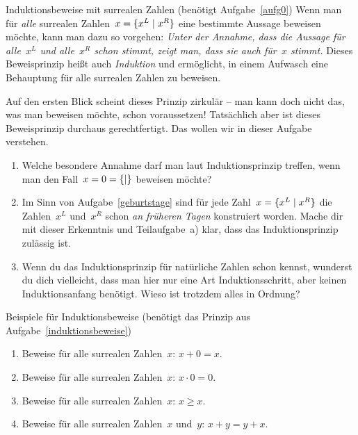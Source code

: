 \documentclass{zirkelblatt}
\begin{document}
\begin{aufgabe}{Induktionsbeweise mit surrealen Zahlen (benötigt Aufgabe~\ref{aufg0})}
\label{induktionsbeweise}
Wenn man für \emph{alle} surrealen Zahlen~$x = \{ x^L \mathrel{|} x^R \}$ eine bestimmte Aussage
beweisen möchte, kann man dazu so vorgehen: \emph{Unter der Annahme, dass die Aussage für
alle~$x^L$ und alle~$x^R$ schon stimmt, zeigt man, dass sie auch für~$x$
stimmt.} Dieses Beweisprinzip heißt auch \emph{Induktion} und ermöglicht, in
einem Aufwasch eine Behauptung für alle surrealen Zahlen zu beweisen.

Auf den ersten Blick scheint dieses Prinzip zirkulär -- man kann doch nicht das,
was man beweisen möchte, schon voraussetzen! Tatsächlich aber ist dieses
Beweisprinzip durchaus gerechtfertigt. Das wollen wir in dieser Aufgabe verstehen.
\begin{enumerate}
\item Welche besondere Annahme darf man laut Induktionsprinzip treffen, wenn
man den Fall~$x = 0 = \{  \mathrel{|}  \}$ beweisen möchte?
\item Im Sinn von Aufgabe~\ref{geburtstage} sind für jede Zahl~$x =
\{ x^L \mathrel{|} x^R \}$ die Zahlen~$x^L$ und~$x^R$
schon \emph{an früheren Tagen} konstruiert worden. Mache dir mit dieser Erkenntnis
und Teilaufgabe~a) klar, dass das Induktionsprinzip zulässig ist.
\item Wenn du das Induktionsprinzip für natürliche Zahlen schon kennst,
wunderst du dich vielleicht, dass man hier nur eine Art Induktionsschritt, aber
keinen Induktionsanfang benötigt. Wieso ist trotzdem alles in Ordnung?
\end{enumerate}
\end{aufgabe}

\begin{aufgabe}{Beispiele für Induktionsbeweise (benötigt
das Prinzip aus Aufgabe~\ref{induktionsbeweise})}
\label{induktionsbeispiele}
\begin{enumerate}
\item Beweise für alle surrealen Zahlen~$x$: $x + 0 = x$.
\item Beweise für alle surrealen Zahlen~$x$: $x \cdot 0 = 0$.
\item Beweise für alle surrealen Zahlen~$x$: $x \geq x$.
\item Beweise für alle surrealen Zahlen~$x$ und~$y$: $x + y = y + x$.
\end{enumerate}
\end{aufgabe}
\end{document}
